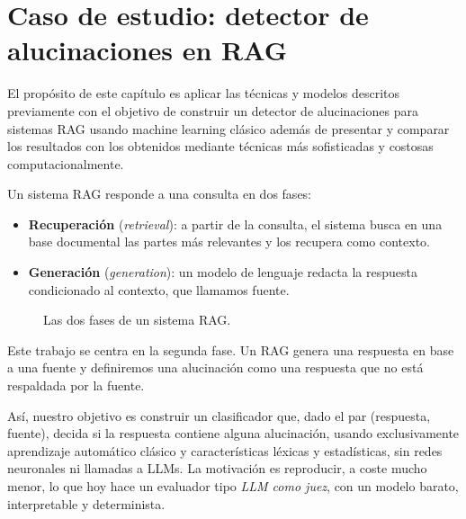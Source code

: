 \documentclass[12pt,a4paper]{report}
\theoremstyle{definition}
\begin{document}
\chapter{Caso de estudio: detector de alucinaciones en RAG}

El propósito de este capítulo es aplicar las técnicas y modelos descritos previamente con el objetivo de construir un detector de alucinaciones para sistemas RAG usando machine learning clásico además de presentar y comparar los resultados con los obtenidos mediante técnicas más sofisticadas y costosas computacionalmente. 

Un sistema RAG responde a una consulta en dos fases:
\begin{itemize}
  \item \textbf{Recuperación} (\emph{retrieval}): a partir de la consulta, el
        sistema busca en una base documental las partes más relevantes y los
        recupera como contexto.
  \item \textbf{Generación} (\emph{generation}): un modelo de lenguaje redacta la
        respuesta condicionado al contexto, que llamamos fuente.
\end{itemize}

\begin{figure}[H]
\centering
{}
\caption{Las dos fases de un sistema RAG.}
\label{fig:rag}
\end{figure}

Este trabajo se centra en la segunda fase. Un RAG genera una respuesta en base a una fuente y definiremos una alucinación como una respuesta que no está respaldada por la fuente. 

Así, nuestro objetivo es construir un clasificador que, dado el par (respuesta, fuente), decida si la respuesta contiene alguna alucinación, usando exclusivamente aprendizaje automático clásico y características léxicas y estadísticas, sin redes neuronales ni llamadas a LLMs. La motivación es reproducir, a coste mucho menor, lo que hoy hace un evaluador tipo \emph{LLM como juez}, con un modelo barato, interpretable y determinista.
\end{document}
